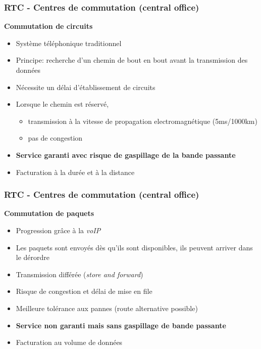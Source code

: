 \begin{frame}[fragile]
	  \frametitle{RTC - Centres de commutation (central office)}
{\large\bf Commutation de circuits}
\begin{itemize}
	\item Système téléphonique traditionnel
	\item Principe: recherche d'un chemin de bout en bout avant la transmission des données
	\item Nécessite un délai d'établissement de circuits
	\item Lorsque le chemin est réservé,
	\begin{itemize}
		\item transmission à la vitesse de propagation electromagnétique (5ms/1000km)
		\item pas de congestion
	\end{itemize}
	\item \textbf{Service garanti avec risque de gaspillage de la bande passante}
	\item Facturation à la durée et à la distance
\end{itemize}
\end{frame}

\begin{frame}[fragile]
  \frametitle{RTC - Centres de commutation (central office)}
{\large\bf Commutation de paquets}
\begin{itemize}
	\item Progression grâce à la \textit{voIP}
	\item Les paquets sont envoyés dès qu'ils sont disponibles, ils peuvent
	arriver dans le dérordre
	\item Transmission différée (\textit{store and forward})
	\item Risque de congestion et délai de mise en file
	\item Meilleure tolérance aux pannes (route alternative possible)
	\item \textbf{Service non garanti mais sans gaspillage de bande passante}
	\item Facturation au volume de données
\end{itemize}
\end{frame}

